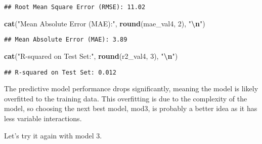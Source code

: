 \documentclass[
]{article}
\newenvironment{Shaded}{\begin{snugshade}}{\end{snugshade}}
\newcommand{\DecValTok}[1]{\textcolor[rgb]{0.00,0.00,0.81}{#1}}
\newcommand{\FunctionTok}[1]{\textcolor[rgb]{0.13,0.29,0.53}{\textbf{#1}}}
\newcommand{\NormalTok}[1]{#1}
\newcommand{\SpecialCharTok}[1]{\textcolor[rgb]{0.81,0.36,0.00}{\textbf{#1}}}
\newcommand{\StringTok}[1]{\textcolor[rgb]{0.31,0.60,0.02}{#1}}
\begin{document}
\begin{verbatim}
## Root Mean Square Error (RMSE): 11.02
\end{verbatim}

\begin{Shaded}
\begin{Highlighting}[]
\FunctionTok{cat}\NormalTok{(}\StringTok{"Mean Absolute Error (MAE):"}\NormalTok{, }\FunctionTok{round}\NormalTok{(mae\_val4, }\DecValTok{2}\NormalTok{), }\StringTok{"}\SpecialCharTok{\textbackslash{}n}\StringTok{"}\NormalTok{)}
\end{Highlighting}
\end{Shaded}

\begin{verbatim}
## Mean Absolute Error (MAE): 3.89
\end{verbatim}

\begin{Shaded}
\begin{Highlighting}[]
\FunctionTok{cat}\NormalTok{(}\StringTok{"R{-}squared on Test Set:"}\NormalTok{, }\FunctionTok{round}\NormalTok{(r2\_val4, }\DecValTok{3}\NormalTok{), }\StringTok{"}\SpecialCharTok{\textbackslash{}n}\StringTok{"}\NormalTok{)}
\end{Highlighting}
\end{Shaded}

\begin{verbatim}
## R-squared on Test Set: 0.012
\end{verbatim}

The predictive model performance drops significantly, meaning the model
is likely overfitted to the training data. This overfitting is due to
the complexity of the model, so choosing the next best model, mod3, is
probably a better idea as it has less variable interactions.

Let's try it again with model 3.
\end{document}

